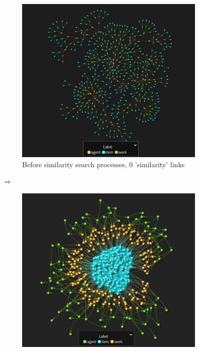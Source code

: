 \documentclass{article}
\begin{document}
\begin{figure}[H]
    \centering
    \captionsetup{justification=centering, size=scriptsize}
    \begin{subfigure}{0.45\textwidth}
        \includegraphics[width=1\textwidth]{larger_graph_before_processing.png}
        \caption{Before similarity search processes, 0 'similarity' links}
        \label{fig:larger-before-processes}
    \end{subfigure}
   	$\Rightarrow$
    \begin{subfigure}{0.45\textwidth}
        \includegraphics[width=1\textwidth]{larger_graph_after_processing.png}

\end{subfigure}
\end{figure}
\end{document}

